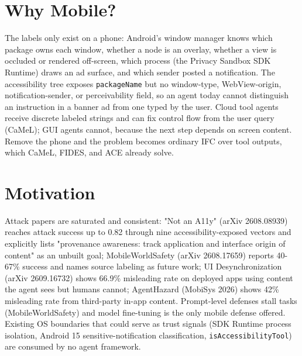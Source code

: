 \documentclass[11pt]{article}
\begin{document}
\section{Why Mobile?}
The labels only exist on a phone: Android's window manager knows which package owns each window, whether a node is an overlay, whether a view is occluded or rendered off-screen, which process (the Privacy Sandbox SDK Runtime) draws an ad surface, and which sender posted a notification. The accessibility tree exposes \texttt{packageName} but no window-type, WebView-origin, notification-sender, or perceivability field, so an agent today cannot distinguish an instruction in a banner ad from one typed by the user. Cloud tool agents receive discrete labeled strings and can fix control flow from the user query (CaMeL); GUI agents cannot, because the next step depends on screen content. Remove the phone and the problem becomes ordinary IFC over tool outputs, which CaMeL, FIDES, and ACE already solve.

\section{Motivation}
Attack papers are saturated and consistent: "Not an A11y" (arXiv 2608.08939) reaches attack success up to 0.82 through nine accessibility-exposed vectors and explicitly lists "provenance awareness: track application and interface origin of content" as an unbuilt goal; MobileWorldSafety (arXiv 2608.17659) reports 40-67\% success and names source labeling as future work; UI Desynchronization (arXiv 2609.16732) shows 66.9\% misleading rate on deployed apps using content the agent sees but humans cannot; AgentHazard (MobiSys 2026) shows 42\% misleading rate from third-party in-app content. Prompt-level defenses stall tasks (MobileWorldSafety) and model fine-tuning is the only mobile defense offered. Existing OS boundaries that could serve as trust signals (SDK Runtime process isolation, Android 15 sensitive-notification classification, \texttt{isAccessibilityTool}) are consumed by no agent framework.
\end{document}
